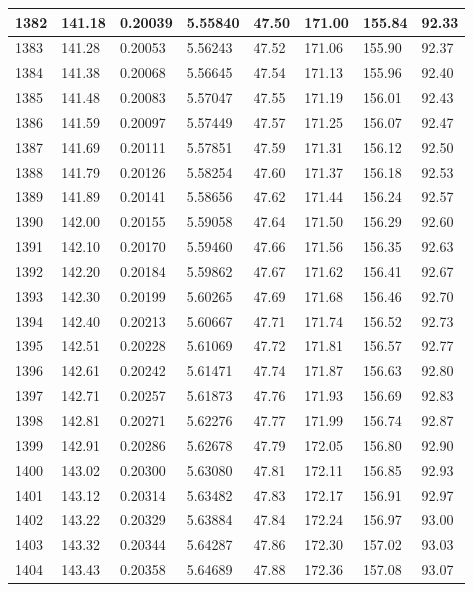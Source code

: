 \documentclass[12pt,a4paper,twoside]{article}
\begin{document}
\begin{center}
\begin{longtable}{l l l l | l l l l}
1382 & 141.18 & 0.20039 & 5.55840 & 47.50 & 171.00 & 155.84 & 92.33 \\ \hline
1383 & 141.28 & 0.20053 & 5.56243 & 47.52 & 171.06 & 155.90 & 92.37 \\ \hline
1384 & 141.38 & 0.20068 & 5.56645 & 47.54 & 171.13 & 155.96 & 92.40 \\ \hline
1385 & 141.48 & 0.20083 & 5.57047 & 47.55 & 171.19 & 156.01 & 92.43 \\ \hline
1386 & 141.59 & 0.20097 & 5.57449 & 47.57 & 171.25 & 156.07 & 92.47 \\ \hline
1387 & 141.69 & 0.20111 & 5.57851 & 47.59 & 171.31 & 156.12 & 92.50 \\ \hline
1388 & 141.79 & 0.20126 & 5.58254 & 47.60 & 171.37 & 156.18 & 92.53 \\ \hline
1389 & 141.89 & 0.20141 & 5.58656 & 47.62 & 171.44 & 156.24 & 92.57 \\ \hline
1390 & 142.00 & 0.20155 & 5.59058 & 47.64 & 171.50 & 156.29 & 92.60 \\ \hline
1391 & 142.10 & 0.20170 & 5.59460 & 47.66 & 171.56 & 156.35 & 92.63 \\ \hline
1392 & 142.20 & 0.20184 & 5.59862 & 47.67 & 171.62 & 156.41 & 92.67 \\ \hline
1393 & 142.30 & 0.20199 & 5.60265 & 47.69 & 171.68 & 156.46 & 92.70 \\ \hline
1394 & 142.40 & 0.20213 & 5.60667 & 47.71 & 171.74 & 156.52 & 92.73 \\ \hline
1395 & 142.51 & 0.20228 & 5.61069 & 47.72 & 171.81 & 156.57 & 92.77 \\ \hline
1396 & 142.61 & 0.20242 & 5.61471 & 47.74 & 171.87 & 156.63 & 92.80 \\ \hline
1397 & 142.71 & 0.20257 & 5.61873 & 47.76 & 171.93 & 156.69 & 92.83 \\ \hline
1398 & 142.81 & 0.20271 & 5.62276 & 47.77 & 171.99 & 156.74 & 92.87 \\ \hline
1399 & 142.91 & 0.20286 & 5.62678 & 47.79 & 172.05 & 156.80 & 92.90 \\ \hline
1400 & 143.02 & 0.20300 & 5.63080 & 47.81 & 172.11 & 156.85 & 92.93 \\ \hline
1401 & 143.12 & 0.20314 & 5.63482 & 47.83 & 172.17 & 156.91 & 92.97 \\ \hline
1402 & 143.22 & 0.20329 & 5.63884 & 47.84 & 172.24 & 156.97 & 93.00 \\ \hline
1403 & 143.32 & 0.20344 & 5.64287 & 47.86 & 172.30 & 157.02 & 93.03 \\ \hline
1404 & 143.43 & 0.20358 & 5.64689 & 47.88 & 172.36 & 157.08 & 93.07 \\ \hline

\end{longtable}
\end{center}
\end{document}
